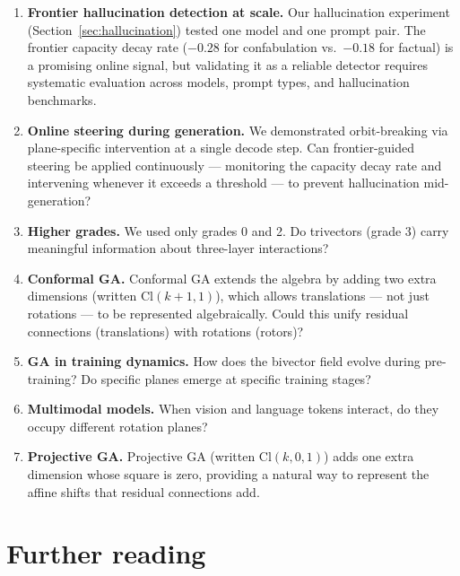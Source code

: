 \documentclass[11pt, twoside, openright]{memoir}
\numberwithin{equation}{chapter}
\begin{document}
\begin{enumerate}
\item \textbf{Frontier hallucination detection at scale.}  Our
  hallucination experiment (Section~\ref{sec:hallucination}) tested
  one model and one prompt pair.  The frontier capacity decay rate
  ($-0.28$ for confabulation vs.\ $-0.18$ for factual) is a
  promising online signal, but validating it as a reliable detector
  requires systematic evaluation across models, prompt types, and
  hallucination benchmarks.

\item \textbf{Online steering during generation.}  We demonstrated
  orbit-breaking via plane-specific intervention at a single decode
  step.  Can frontier-guided steering be applied continuously ---
  monitoring the capacity decay rate and intervening whenever it
  exceeds a threshold --- to prevent hallucination mid-generation?

\item \textbf{Higher grades.}  We used only grades 0 and 2.  Do
  trivectors (grade 3) carry meaningful information about three-layer
  interactions?

\item \textbf{Conformal GA.}  Conformal GA extends the algebra by
  adding two extra dimensions (written $\mathrm{Cl}(k+1,1)$), which
  allows translations --- not just rotations --- to be represented
  algebraically.  Could this unify residual connections (translations)
  with rotations (rotors)?

\item \textbf{GA in training dynamics.}  How does the bivector field
  evolve during pre-training?  Do specific planes emerge at specific
  training stages?

\item \textbf{Multimodal models.}  When vision and language tokens
  interact, do they occupy different rotation planes?

\item \textbf{Projective GA.}  Projective GA (written
  $\mathrm{Cl}(k,0,1)$) adds one extra dimension whose square is
  zero, providing a natural way to represent the affine shifts that
  residual connections add.
\end{enumerate}

\section{Further reading}
\end{document}
